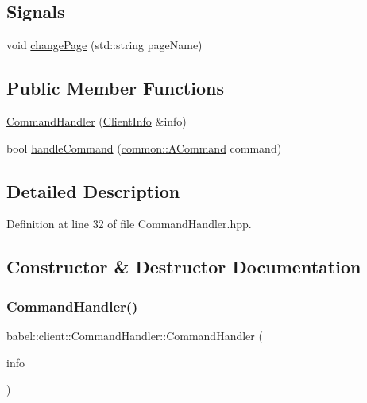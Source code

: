 \subsection*{Signals}
\begin{DoxyCompactItemize}
\item 
void \mbox{\hyperlink{classbabel_1_1client_1_1_command_handler_adfe2c7e5fbed541db090140a24830f2d}{change\+Page}} (std\+::string page\+Name)
\end{DoxyCompactItemize}
\subsection*{Public Member Functions}
\begin{DoxyCompactItemize}
\item 
\mbox{\hyperlink{classbabel_1_1client_1_1_command_handler_a46d7f16f730d8f00bb164aa9b9cfaf9c}{Command\+Handler}} (\mbox{\hyperlink{classbabel_1_1client_1_1_client_info}{Client\+Info}} \&info)
\item 
bool \mbox{\hyperlink{classbabel_1_1client_1_1_command_handler_afd1572be08e6a1a8c90cb90f47174e06}{handle\+Command}} (\mbox{\hyperlink{classbabel_1_1common_1_1_a_command}{common\+::\+A\+Command}} command)
\end{DoxyCompactItemize}


\subsection{Detailed Description}


Definition at line 32 of file Command\+Handler.\+hpp.



\subsection{Constructor \& Destructor Documentation}
\mbox{\label{classbabel_1_1client_1_1_command_handler_a46d7f16f730d8f00bb164aa9b9cfaf9c}} 
\subsubsection{\texorpdfstring{Command\+Handler()}{CommandHandler()}}
{\footnotesize\ttfamily babel\+::client\+::\+Command\+Handler\+::\+Command\+Handler (\begin{DoxyParamCaption}\item[{\mbox{\hyperlink{classbabel_1_1client_1_1_client_info}{Client\+Info}} \&}]{info }\end{DoxyParamCaption})}




